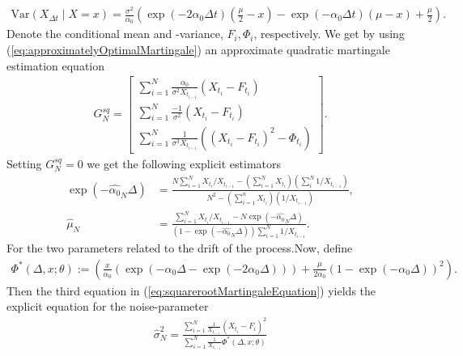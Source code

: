 \begin{align}
    \mathrm{Var}\left(X_{\Delta t} \middle| X = x \right) = \frac{\sigma^2}{\alpha_0}\left(\exp\left(-2\alpha_0\Delta t \right)\left(\frac{\mu}{2} - x   \right) - \exp\left(-\alpha_0\Delta t\right)\left(\mu - x\right) + \frac{\mu}{2}\right). \label{eq:squarerootCondVariance}
\end{align}
Denote the conditional mean and -variance, $F_i, \Phi_i$, respectively. We get by using (\ref{eq:approximatelyOptimalMartingale}) an approximate quadratic martingale estimation equation
\begin{align}
        G_N^{sq} = \begin{bmatrix}
            \sum_{i = 1}^N \frac{\alpha_0}{\sigma^2 X_{t_{i-1}}}\left(X_{t_i} - F_{t_i}\right)\\
            \sum_{i = 1}^N \frac{-1}{\sigma^2}\left(X_{t_i} - F_{t_i}\right)\\
            \sum_{i = 1}^N \frac{1}{\sigma^3 X_{t_{i-1}}}\left(\left(X_{t_i} - F_{t_i}\right)^2 - \Phi_{t_i}\right) \label{eq:squarerootMartingaleEquation}
        \end{bmatrix}.
\end{align}
Setting $G_N^{sq} = 0$ we get the following explicit estimators
\begin{align}
    \exp\left(-\hat{\alpha_0}_N\Delta\right) &= \frac{N\sum_{i=1}^{N}X_{t_i} / X_{t_{i - 1}} - \left(\sum_{i = 1}^{N}X_{t_i}\right)\left(\sum_{i}^{N}1/X_{t_{i - 1}}\right)}{N^2 - \left(\sum_{i = 1}^{n}X_{t_i}\right)\left(1/X_{t_{i - 1}}\right)},\\
    \hat{\mu}_N &= \frac{\sum_{i = 1}^{N}X_{t_i} / X_{t_{i - 1}} - N \exp\left(-\hat{\alpha_0}_N\Delta\right)}{\left(1-\exp\left(-\hat{\alpha_0}_N\Delta\right)\right)\sum_{i = 1}^{N}1/X_{t_{i - 1}}}.
\end{align}
For the two parameters related to the drift of the process.Now, define
\begin{align}
    \Phi^*(\Delta, x; \theta) := \left(\frac{x}{\alpha_0}\left(\exp\left(-\alpha_0\Delta - \exp\left(-2\alpha_0 \Delta\right)\right)\right) + \frac{\mu}{2\alpha_0}\left(1-\exp\left(-\alpha_0\Delta\right)\right)^2\right).
\end{align}
Then the third equation in (\ref{eq:squarerootMartingaleEquation}) yields the explicit equation for the noise-parameter
\begin{align}
    \hat{\sigma}^2_N = \frac{\sum_{i = 1}^{N}\frac{1}{X_{t_{i - 1}}}\left(X_{t_i} - F_i\right)^2}{\sum_{i = 1}^{N}\frac{1}{X_{t_{i - 1}}}\Phi^*(\Delta, x; \theta)}
\end{align}
